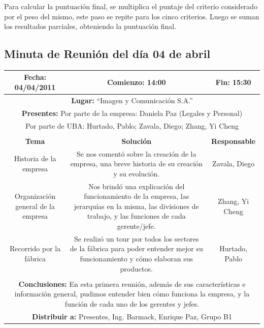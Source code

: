 \documentclass[a4paper,10pt,titlepage]{article}
\begin{document}
Para calcular la puntuación final, se multiplica el puntaje del criterio considerado por el peso del mismo, este paso se repite para los cinco criterios. Luego se suman los resultados parciales, obteniendo la puntuación final.


\newpage

\subsection{Minuta de Reuni\'on del d\'ia 04 de abril}
\vspace{1cm}
\begin{center}
\begin{tabular}{|c|c|c|}
	\hline
	\textbf{Fecha:} 04/04/2011 &  \textbf{Comienzo:} 14:00  &  \textbf{Fin:} 15:30 \\ \hline	

	\multicolumn{3}{|c|}{\textbf{Lugar:} ``Imagen y Comunicaci\'on S.A.''} \\
	\hline \multicolumn{3}{|p{0.86\linewidth}|}{\textbf{Presentes:} Por parte de la empresa: Daniela Paz (Legales y Personal)}  \\
	\multicolumn{3}{|p{0.86\linewidth}|}{Por parte de UBA:  Hurtado, Pablo; Zavala, Diego; Zhang, Yi Cheng} \\
	\hline
    \rowcolor[gray]{0.8} & & \\
    \hline
    \textbf{Tema} & \textbf{Solución} & \textbf{Responsable}\\
    \hline
    \multicolumn{1}{|p{0.33\linewidth}|}{Historia de la empresa} & \multicolumn{1}{p{0.33\linewidth}|}{Se nos coment\'o sobre la creaci\'on de la empresa, una breve historia de su creaci\'on y su evoluci\'on.} & \multicolumn{1}{p{0.20\linewidth}|}{Zavala, Diego}\\\hline
    \multicolumn{1}{|p{0.33\linewidth}|}{Organizaci\'on general de la empresa} & \multicolumn{1}{p{0.33\linewidth}|}{Nos brind\'o una explicaci\'on del funcionamiento de la empresa, las jerarqu\'ias en la misma, las divisiones de trabajo, y las funciones de cada gerente/jefe.} & \multicolumn{1}{p{0.20\linewidth}|}{Zhang, Yi Cheng}\\\hline
    \multicolumn{1}{|p{0.33\linewidth}|}{Recorrido por la f\'abrica} & \multicolumn{1}{p{0.33\linewidth}|}{Se realiz\'o un tour por todos los sectores de la f\'abrica para poder entender mejor su funcionamiento y c\'omo elaboran sus productos.} & \multicolumn{1}{p{0.20\linewidth}|}{Hurtado, Pablo}\\\hline
    \rowcolor[gray]{0.8} & & \\\hline
    \multicolumn{3}{|p{0.86\linewidth}|}{\textbf{Conclusiones:} En esta primera reuni\'on, adem\'as de sus caracter\'isticas e informaci\'on general, pudimos entender bien c\'omo funciona la empresa, y la funci\'on de cada uno de los gerentes y jefes.}\\\hline
    \multicolumn{3}{|p{0.86\linewidth}|}{\textbf{Distribuir a:} Presentes, Ing. Barmack, Enrique Paz, Grupo B1}\\\hline
\end{tabular} 
\end{center}
\end{document}
